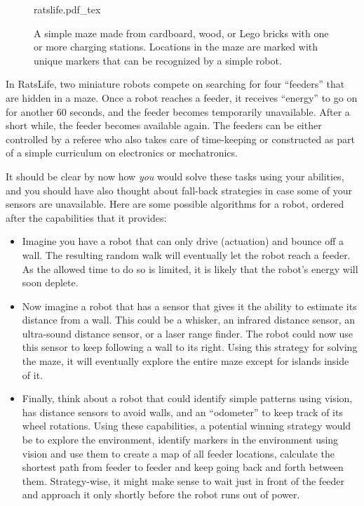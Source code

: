 \begin{figure}
    \centering
    \def\svgwidth{\textwidth}
    {ratslife.pdf_tex}
    \caption{A simple maze made from cardboard, wood, or Lego bricks with one or more charging stations. Locations in the maze are marked with unique markers that can be recognized by a simple robot.}
    \label{fig:ratslife}
\end{figure}

In RatsLife, two miniature robots compete on searching for four ``feeders'' that are hidden in  a maze. Once a robot reaches a feeder, it receives ``energy'' to go on for another $60$ seconds, and the feeder becomes temporarily unavailable. After a short while, the feeder becomes available again. The feeders can be either controlled by a referee who also takes care of time-keeping or constructed as part of a simple curriculum on electronics or mechatronics.

It should be clear by now how \textsl{you} would solve these tasks using your abilities, and you should have also thought about fall-back strategies in case some of your sensors are unavailable. Here are some possible algorithms for a robot, ordered after the capabilities that it provides:
\begin{itemize}
\item Imagine you have a robot that can only drive (actuation) and bounce off a wall. The resulting random walk will eventually let the robot reach a feeder. As the allowed time to do so is limited, it is likely that the robot's energy will soon deplete.
\item Now imagine a robot that has a sensor that gives it the ability to estimate its distance from a wall. This could be a whisker, an infrared distance sensor, an ultra-sound distance sensor, or a laser range finder. The robot could now use this sensor to keep following a wall to its right. Using this strategy for solving the maze, it will eventually explore the entire maze except for islands inside of it.
\item Finally, think about a robot that could identify simple patterns using vision, has distance sensors to avoid walls, and an ``odometer'' to keep track of its wheel rotations. Using these capabilities, a potential winning strategy would be to explore the environment, identify markers in the environment using vision and use them to create a map of all feeder locations, calculate the shortest path from feeder to feeder and keep going back and forth between them. Strategy-wise, it might make sense to wait just in front of the feeder and approach it only shortly before the robot runs out of power.
\end{itemize}

